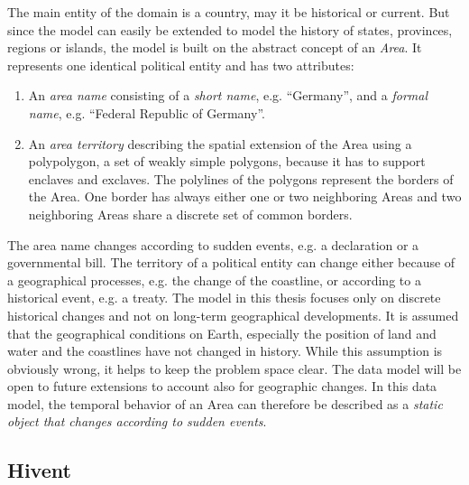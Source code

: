 The main entity of the domain is a country, may it be historical or current. But since the model can easily be extended to model the history of states, provinces, regions or islands, the model is built on the abstract concept of an \emph{Area}. It represents one identical political entity and has two attributes:

\begin{enumerate}
  \item An \emph{area name} consisting of a \emph{short name}, e.g. ``Germany'', and a \emph{formal name}, e.g. ``Federal Republic of Germany''.
  \item An \emph{area territory} describing the spatial extension of the Area using a polypolygon, a set of weakly simple polygons, because it has to support enclaves and exclaves. The polylines of the polygons represent the borders of the Area. One border has always either one or two neighboring Areas and two neighboring Areas share a discrete set of common borders.
\end{enumerate}

The area name changes according to sudden events, e.g. a declaration or a governmental bill. The territory of a political entity can change either because of a geographical processes, e.g. the change of the coastline, or according to a historical event, e.g. a treaty. The model in this thesis focuses only on discrete historical changes and not on long-term geographical developments. It is assumed that the geographical conditions on Earth, especially the position of land and water and the coastlines have not changed in history. While this assumption is obviously wrong, it helps to keep the problem space clear. The data model will be open to future extensions to account also for geographic changes. In this data model, the temporal behavior of an Area can therefore be described as a \emph{static object that changes according to sudden events}.



\subsection{Hivent} %
\label{sub:hivent}

